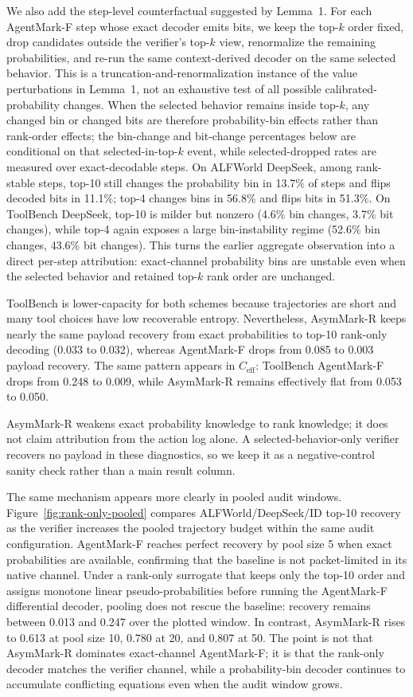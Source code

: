 \documentclass[conference,compsoc]{IEEEtran}
\newcommand{\ours}{AsymMark-R}
\newcommand{\agentmark}{AgentMark-F}
\newcommand{\Ceff}{\ensuremath{C_{\mathrm{eff}}}}
\begin{document}
We also add the step-level counterfactual suggested by Lemma~1. For each \agentmark{} step whose exact decoder emits bits, we keep the top-$k$ order fixed, drop candidates outside the verifier's top-$k$ view, renormalize the remaining probabilities, and re-run the same context-derived decoder on the same selected behavior. This is a truncation-and-renormalization instance of the value perturbations in Lemma~1, not an exhaustive test of all possible calibrated-probability changes. When the selected behavior remains inside top-$k$, any changed bin or changed bits are therefore probability-bin effects rather than rank-order effects; the bin-change and bit-change percentages below are conditional on that selected-in-top-$k$ event, while selected-dropped rates are measured over exact-decodable steps. On ALFWorld DeepSeek, among rank-stable steps, top-10 still changes the probability bin in 13.7\% of steps and flips decoded bits in 11.1\%; top-4 changes bins in 56.8\% and flips bits in 51.3\%. On ToolBench DeepSeek, top-10 is milder but nonzero (4.6\% bin changes, 3.7\% bit changes), while top-4 again exposes a large bin-instability regime (52.6\% bin changes, 43.6\% bit changes). This turns the earlier aggregate observation into a direct per-step attribution: exact-channel probability bins are unstable even when the selected behavior and retained top-$k$ rank order are unchanged.

ToolBench is lower-capacity for both schemes because trajectories are short and many tool choices have low recoverable entropy. Nevertheless, \ours{} keeps nearly the same payload recovery from exact probabilities to top-10 rank-only decoding (0.033 to 0.032), whereas \agentmark{} drops from 0.085 to 0.003 payload recovery. The same pattern appears in $\Ceff$: ToolBench \agentmark{} drops from 0.248 to 0.009, while \ours{} remains effectively flat from 0.053 to 0.050.

\ours{} weakens exact probability knowledge to rank knowledge; it does not claim attribution from the action log alone. A selected-behavior-only verifier recovers no payload in these diagnostics, so we keep it as a negative-control sanity check rather than a main result column.

The same mechanism appears more clearly in pooled audit windows. Figure~\ref{fig:rank-only-pooled} compares ALFWorld/DeepSeek/ID top-10 recovery as the verifier increases the pooled trajectory budget within the same audit configuration. \agentmark{} reaches perfect recovery by pool size 5 when exact probabilities are available, confirming that the baseline is not packet-limited in its native channel. Under a rank-only surrogate that keeps only the top-10 order and assigns monotone linear pseudo-probabilities before running the \agentmark{} differential decoder, pooling does not rescue the baseline: recovery remains between 0.013 and 0.247 over the plotted window. In contrast, \ours{} rises to 0.613 at pool size 10, 0.780 at 20, and 0.807 at 50. The point is not that \ours{} dominates exact-channel \agentmark{}; it is that the rank-only decoder matches the verifier channel, while a probability-bin decoder continues to accumulate conflicting equations even when the audit window grows.
\end{document}
